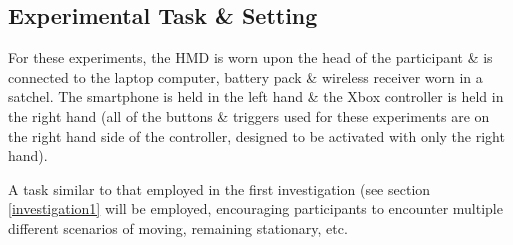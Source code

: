\subsection{Experimental Task \& Setting}
For these experiments, the HMD is worn upon the head of the participant \& is connected to the laptop computer, battery pack \& wireless receiver worn in a satchel. The smartphone is held in the left hand \& the Xbox controller is held in the right hand (all of the buttons \& triggers used for these experiments are on the right hand side of the controller, designed to be activated with only the right hand).

A task similar to that employed in the first investigation (see section \ref{investigation1} will be employed, encouraging participants to encounter multiple different scenarios of moving, remaining stationary, etc.








